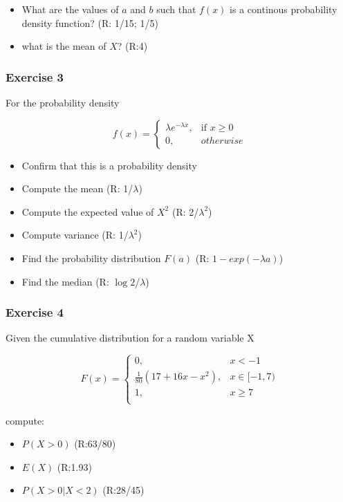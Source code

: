 \documentclass[
]{book}
\providecommand{\tightlist}{%
  \setlength{\itemsep}{0pt}\setlength{\parskip}{0pt}}
\begin{document}
\begin{itemize}
\item
  What are the values of \(a\) and \(b\) such that \(f(x)\) is a continous probability density function? (R: 1/15; 1/5)
\item
  what is the mean of \(X\)? (R:4)
\end{itemize}

\hypertarget{exercise-3-3}{%
\subsubsection{Exercise 3}\label{exercise-3-3}}

For the probability density

\[
    f(x)= 
\begin{cases}
    \lambda e^{-\lambda x},& \text{if } x \geq 0\\
    0,& otherwise 
\end{cases}
\]

\begin{itemize}
\tightlist
\item
  Confirm that this is a probability density
\item
  Compute the mean (R: 1/\(\lambda\))
\item
  Compute the expected value of \(X^2\) (R: 2/\(\lambda^2\))
\item
  Compute variance (R: 1/\(\lambda^2\))
\item
  Find the probability distribution \(F(a)\) (R: \(1-exp(-\lambda a)\))
\item
  Find the median (R: \(\log{2}\)/\(\lambda\))
\end{itemize}

\hypertarget{exercise-4-2}{%
\subsubsection{Exercise 4}\label{exercise-4-2}}

Given the cumulative distribution for a random variable X

\[
    F(x)= 
\begin{cases}
0, & x  < -1 \\
\frac{1}{80}(17+16x-x^2),& x \in [-1,7)\\
1,& x \geq 7\\
\end{cases}
\]

compute:

\begin{itemize}
\tightlist
\item
  \(P(X>0)\) (R:63/80)
\item
  \(E(X)\) (R:1.93)
\item
  \(P(X>0|X<2)\) (R:28/45)
\end{itemize}
\end{document}
